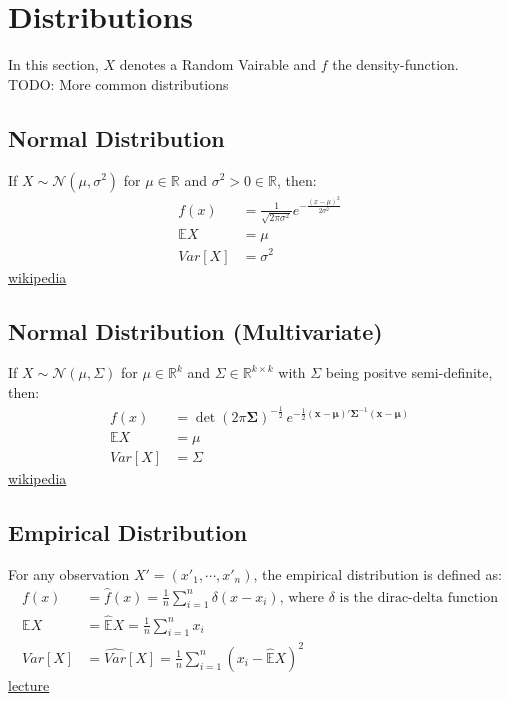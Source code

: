 \section{Distributions}
In this section, $X$ denotes a Random Vairable and $f$ the density-function.\\
TODO: More common distributions
\subsection{Normal Distribution}
If $X \sim {\mathcal {N}}(\mu ,\sigma ^{2})$ for ${\displaystyle \mu \in \mathbb {R}}$ and $\sigma ^{2} > 0 \in \mathbb {R}$, then:
\begin{align*}
	f(x) &= {\displaystyle {\frac {1}{\sqrt {2\pi \sigma ^{2}}}}e^{-{\frac {(x-\mu )^{2}}{2\sigma ^{2}}}}}\\
	\mathbb{E}X &= \mu \\
	Var[X] &= \sigma^2
\end{align*}
\href{https://en.wikipedia.org/wiki/Normal_distribution}{wikipedia}

\subsection{Normal Distribution (Multivariate)}
If $X \sim {\mathcal {N}}(\mu ,\Sigma)$ for $\mu \in \mathbb {R}^k$ and $\Sigma \in \mathbb {R}^{k \times k}$ with $\Sigma$ being positve semi-definite, then:
\begin{align*}
	f(x) &= \operatorname {det} (2\pi {\boldsymbol {\Sigma }})^{-{\frac {1}{2}}}\,e^{-{\frac {1}{2}}(\mathbf {x} -{\boldsymbol {\mu }})'{\boldsymbol {\Sigma }}^{-1}(\mathbf {x} -{\boldsymbol {\mu }})}\\
	\mathbb{E}X &= \mu \\
	Var[X] &= \Sigma
\end{align*}
\href{https://en.wikipedia.org/wiki/Multivariate_normal_distribution}{wikipedia}

\subsection{Empirical Distribution}
For any observation $X'=(x'_1, \cdots, x'_n)$, the empirical distribution is defined as:
\begin{align*}
	f(x) &= \hat{f}(x) =\frac{1}{n}\sum_{i=1}^{n}\delta(x - x_i)\text{, where $\delta$ is the dirac-delta function}\\
	\mathbb{E}X &= \hat{\mathbb{E}}X = \frac{1}{n}\sum_{i=1}^{n}x_i \\
	Var[X] &= \hat{Var}[X] =\frac{1}{n}\sum_{i=1}^{n}(x_i-\hat{\mathbb{E}}X)^2
\end{align*}
\href{http://www.stat.umn.edu/geyer/5102/slides/s1.pdf}{lecture}

